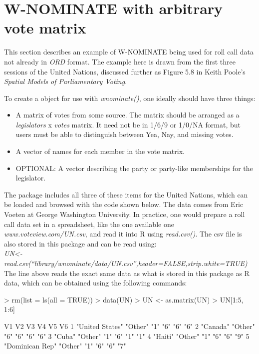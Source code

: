 \documentclass[12pt]{article}
\begin{document}
\section{W-NOMINATE with arbitrary vote matrix}

This section describes an example of W-NOMINATE being used for
roll call data not already in \emph{ORD} format.  The example here
is drawn from the first three sessions of the United Nations,
discussed further as Figure 5.8 in Keith Poole's \emph{Spatial
Models of Parliamentary Voting}.

To create a \verb@rollcall@ object for use with \emph{wnominate()},
one ideally should have three things:

\begin{itemize}
\item A matrix of votes from some source. The matrix should be
arranged as a \textit{legislators} x \textit{votes} matrix.  It
need not be in 1/6/9 or 1/0/NA format, but users must be able to
distinguish between Yea, Nay, and missing votes.

\item A vector of names for each member in the vote matrix.

\item OPTIONAL: A vector describing the party or party-like
memberships for the legislator.

\end{itemize}

The \verb@wnominate@ package includes all three of these items for
the United Nations, which can be loaded and browsed with the code 
shown below.  The data comes from Eric Voeten at George Washington University. 
In practice, one would prepare a roll call data set in a spreadsheet, like the
one available one \emph{www.voteview.com/UN.csv}, and read it into R using \emph{read.csv()}.
The csv file is also stored in this package and can be read using:\\

\noindent 
\emph{UN<-read.csv(``library/wnominate/data/UN.csv'',header=FALSE,strip.white=TRUE) }\\


The line above reads the exact same data as what is stored in this
package as R data, which can be obtained using the following commands:

\begin{Schunk}
\begin{Sinput}
> rm(list = ls(all = TRUE))
> data(UN)
> UN <- as.matrix(UN)
> UN[1:5, 1:6]
\end{Sinput}
\begin{Soutput}
  V1              V2      V3  V4  V5  V6 
1 "United States" "Other" "1" "6" "6" "6"
2 "Canada"        "Other" "6" "6" "6" "6"
3 "Cuba"          "Other" "1" "6" "1" "1"
4 "Haiti"         "Other" "1" "6" "6" "9"
5 "Dominican Rep" "Other" "1" "6" "6" "7"
\end{Soutput}
\end{Schunk}
\end{document}
